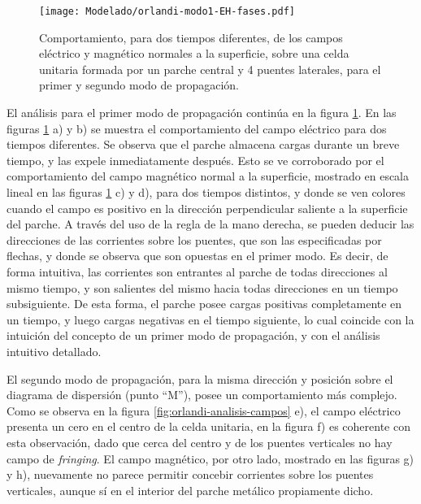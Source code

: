 \begin{figure}[h]
	\centering
	\texttt{[image: Modelado/orlandi-modo1-EH-fases.pdf]}
	\caption{Comportamiento, para dos tiempos diferentes, de los campos eléctrico y magnético normales a la superficie, sobre una celda unitaria formada por un parche central y 4 puentes laterales, para el primer y segundo modo de propagación.}
	\label{fig:orlandi-analisis-campos-fases}
\end{figure}

El análisis para el primer modo de propagación continúa en la figura \ref{fig:orlandi-analisis-campos-fases}. En las figuras \ref{fig:orlandi-analisis-campos-fases} a) y b) se muestra el comportamiento del campo eléctrico para dos tiempos diferentes. Se observa que el parche almacena cargas durante un breve tiempo, y las expele inmediatamente después. Esto se ve corroborado por el comportamiento del campo magnético normal a la superficie, mostrado en escala lineal en las figuras \ref{fig:orlandi-analisis-campos-fases} c) y d), para dos tiempos distintos, y donde se ven colores cuando el campo es positivo en la dirección perpendicular saliente a la superficie del parche. A través del uso de la regla de la mano derecha, se pueden deducir las direcciones de las corrientes sobre los puentes, que son las especificadas por flechas, y donde se observa que son opuestas en el primer modo. Es decir, de forma intuitiva, las corrientes son entrantes al parche de todas direcciones al mismo tiempo, y son salientes del mismo hacia todas direcciones en un tiempo subsiguiente. De esta forma, el parche posee cargas positivas completamente en un tiempo, y luego cargas negativas en el tiempo siguiente, lo cual coincide con la intuición del concepto de un primer modo de propagación, y con el análisis intuitivo detallado.

El segundo modo de propagación, para la misma dirección y posición sobre el diagrama de dispersión (punto \enquote{M}), posee un comportamiento más complejo. Como se observa en la figura \ref{fig:orlandi-analisis-campos} e), el campo eléctrico presenta un cero en el centro de la celda unitaria, en la figura f) es coherente con esta observación, dado que cerca del centro y de los puentes verticales no hay campo de \textit{fringing}. El campo magnético, por otro lado, mostrado en las figuras g) y h), nuevamente no parece permitir concebir corrientes sobre los puentes verticales, aunque sí en el interior del parche metálico propiamente dicho.


